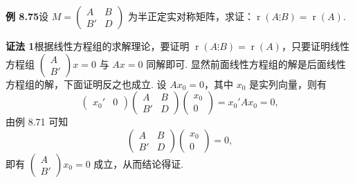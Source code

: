 \documentclass[UTF8, 12pt, fontset=fandol, oneside]{ctexart}
\begin{document}
\noindent\textbf{例 8.75}\quad 设 $M=\left(\begin{array}{cc}A&B\\ B'&D\end{array}\right)$ 为半正定实对称矩阵，求证：$\operatorname{r}(A\vdots B)=\operatorname{r}(A)$.

\noindent\textbf{证法 1}\quad 根据线性方程组的求解理论，要证明 $\operatorname{r}(A\vdots B)=\operatorname{r}(A)$，只要证明线性方程组 $\left(\begin{array}{c}A\\ B'\end{array}\right)x=0$ 与 $Ax=0$ 同解即可. 显然前面线性方程组的解是后面线性方程组的解，下面证明反之也成立. 设 $Ax_0=0$，其中 $x_0$ 是实列向量，则有
\[
\left(\begin{array}{cc}x_0'&0\end{array}\right)
\left(\begin{array}{cc}
A & B\\
B' & D
\end{array}\right)
\left(\begin{array}{c}
x_0\\
0
\end{array}\right)=x_0'Ax_0=0,
\]
由例 8.71 可知
\[
\left(\begin{array}{cc}
A & B\\
B' & D
\end{array}\right)
\left(\begin{array}{c}
x_0\\
0
\end{array}\right)=0,
\]
即有 $\left(\begin{array}{c}A\\ B'\end{array}\right)x_0=0$ 成立，从而结论得证.
\end{document}
